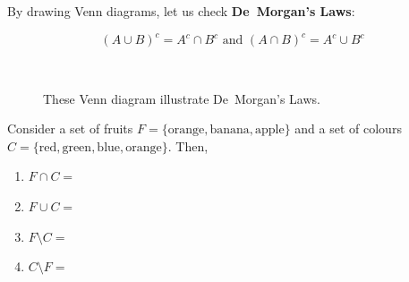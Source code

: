 By drawing  Venn diagrams,  let us check {\bf De~Morgan's Laws}:

\[
\boxed{
\left(A\cup B\right)^c = A^c \cap B^c \text{  and  } \left( A \cap B \right)^c = A^c \cup B^c
}
\]

\begin{figure}[htbp]
\centering
\mbox{
\quad
{}
}
\caption{These  Venn diagram illustrate De~Morgan's Laws.} \label{F:DeMorganslaws}
\end{figure}



\begin{classwork}
Consider a set of fruits $F=\{\text{orange}, \text{banana}, \text{apple}\}$ and a set of colours $C = \{\text{red}, \text{green}, \text{blue}, \text{orange}\}$.  Then,
\begin{enumerate}
\item $F \cap C = $
\item $F \cup C = $
\item $F \setminus C = $
\item $C \setminus F = $
\end{enumerate}
\end{classwork}




